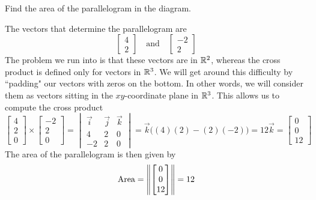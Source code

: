 \documentclass{ximera}
\begin{document}
\begin{example}\label{ex:areaofparallelogram}
Find the area of the parallelogram in the diagram.
\begin{center}
\end{center}
\begin{explanation}
The vectors that determine the parallelogram are 
$$\begin{bmatrix}4\\2\end{bmatrix}\quad\text{and}\quad\begin{bmatrix}-2\\2\end{bmatrix}$$
The problem we run into is that these vectors are in $\mathbb{R}^2$, whereas the cross product is defined only for vectors in $\mathbb{R}^3$.  We will get around this difficulty by ``padding" our vectors with zeros on the bottom.  In other words, we will consider them as vectors sitting in the $xy$-coordinate plane in $\mathbb{R}^3$.  This allows us to compute the cross product 
$$\begin{bmatrix}4\\2\\0\end{bmatrix}\times\begin{bmatrix}-2\\2\\0\end{bmatrix}=\begin{vmatrix}\vec{i}&\vec{j}&\vec{k}\\4&2&0\\-2&2&0\end{vmatrix}=\vec{k}\Big((4)(2)-(2)(-2)\Big)=12\vec{k}=\begin{bmatrix}0\\0\\12\end{bmatrix}$$
The area of the parallelogram is then given by
$$\mbox{Area}=\left\lVert\begin{bmatrix}0\\0\\12\end{bmatrix}\right\rVert=12$$
\end{explanation}
\end{example}
\end{document}

